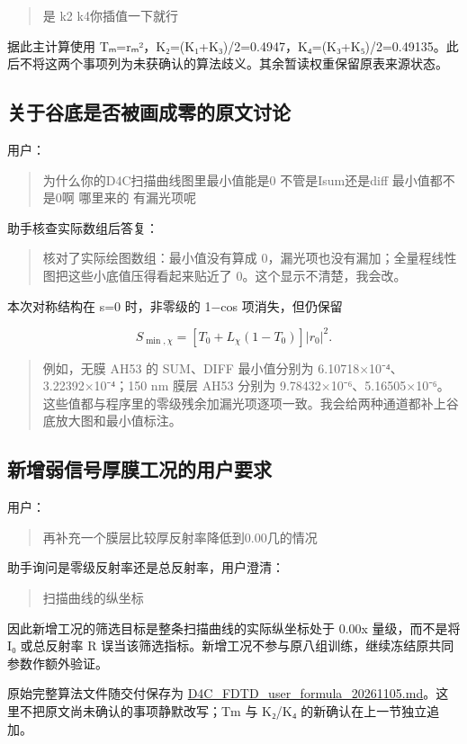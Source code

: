 \documentclass[
  chinese,
  UTF8,
  a4paper,
  11pt]{ctexart}
\begin{document}
\begin{quote}
是 k2 k4你插值一下就行
\end{quote}

据此主计算使用
Tₘ=\textbar rₘ\textbar²，K₂=(K₁+K₃)/2=0.4947，K₄=(K₃+K₅)/2=0.49135。此后不将这两个事项列为未获确认的算法歧义。其余暂读权重保留原表来源状态。

\subsection{关于谷底是否被画成零的原文讨论}\label{ux5173ux4e8eux8c37ux5e95ux662fux5426ux88abux753bux6210ux96f6ux7684ux539fux6587ux8ba8ux8bba}

用户：

\begin{quote}
为什么你的D4C扫描曲线图里最小值能是0 不管是Isum还是diff 最小值都不是0啊
哪里来的 有漏光项呢
\end{quote}

助手核查实际数组后答复：

\begin{quote}
核对了实际绘图数组：最小值没有算成
0，漏光项也没有漏加；全量程线性图把这些小底值压得看起来贴近了
0。这个显示不清楚，我会改。
\end{quote}

本次对称结构在 s=0 时，非零级的 1−cos 项消失，但仍保留

\[S_{\min,\chi}=[T_0+L_\chi(1-T_0)]|r_0|^2.\]

\begin{quote}
例如，无膜 AH53 的 SUM、DIFF 最小值分别为
6.10718×10⁻⁴、3.22392×10⁻⁴；150 nm 膜层 AH53 分别为
9.78432×10⁻⁶、5.16505×10⁻⁶。这些值都与程序里的零级残余加漏光项逐项一致。我会给两种通道都补上谷底放大图和最小值标注。
\end{quote}

\subsection{新增弱信号厚膜工况的用户要求}\label{ux65b0ux589eux5f31ux4fe1ux53f7ux539aux819cux5de5ux51b5ux7684ux7528ux6237ux8981ux6c42}

用户：

\begin{quote}
再补充一个膜层比较厚反射率降低到0.00几的情况
\end{quote}

助手询问是零级反射率还是总反射率，用户澄清：

\begin{quote}
扫描曲线的纵坐标
\end{quote}

因此新增工况的筛选目标是整条扫描曲线的实际纵坐标处于 0.00x
量级，而不是将 I₀ 或总反射率 R
误当该筛选指标。新增工况不参与原八组训练，继续冻结原共同参数作额外验证。

原始完整算法文件随交付保存为
\href{../inputs/D4C_FDTD_user_formula_20261105.md}{D4C\_FDTD\_user\_formula\_20261105.md}。这里不把原文尚未确认的事项静默改写；Tm
与 K₂/K₄ 的新确认在上一节独立追加。
\end{document}

